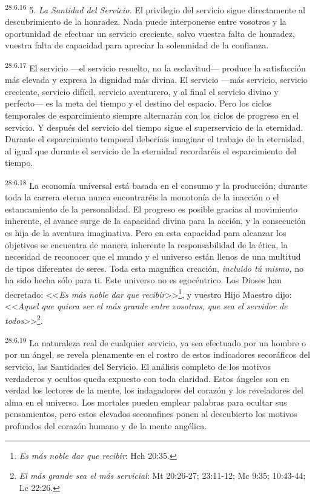 \par
\textsuperscript{28:6.16} 5. \textit{La Santidad del Servicio.} El privilegio del servicio sigue directamente al descubrimiento de la honradez. Nada puede interponerse entre vosotros y la oportunidad de efectuar un servicio creciente, salvo vuestra falta de honradez, vuestra falta de capacidad para apreciar la solemnidad de la confianza.

\par
\textsuperscript{28:6.17} El servicio ---el servicio resuelto, no la esclavitud--- produce la satisfacción más elevada y expresa la dignidad más divina. El servicio ---más servicio, servicio creciente, servicio difícil, servicio aventurero, y al final el servicio divino y perfecto--- es la meta del tiempo y el destino del espacio. Pero los ciclos temporales de esparcimiento siempre alternarán con los ciclos de progreso en el servicio. Y después del servicio del tiempo sigue el superservicio de la eternidad. Durante el esparcimiento temporal deberíais imaginar el trabajo de la eternidad, al igual que durante el servicio de la eternidad recordaréis el esparcimiento del tiempo.

\par
\textsuperscript{28:6.18} La economía universal está basada en el consumo y la producción; durante toda la carrera eterna nunca encontraréis la monotonía de la inacción o el estancamiento de la personalidad. El progreso es posible gracias al movimiento inherente, el avance surge de la capacidad divina para la acción, y la consecución es hija de la aventura imaginativa. Pero en esta capacidad para alcanzar los objetivos se encuentra de manera inherente la responsabilidad de la ética, la necesidad de reconocer que el mundo y el universo están llenos de una multitud de tipos diferentes de seres. Toda esta magnífica creación, \textit{incluido tú mismo,} no ha sido hecha sólo para ti. Este universo no es egocéntrico. Los Dioses han decretado: <<\textit{Es más noble dar que recibir}>>\footnote{\textit{Es más noble dar que recibir}: Hch 20:35.}, y vuestro Hijo Maestro dijo: <<\textit{Aquel que quiera ser el más grande entre vosotros, que sea el servidor de todos}>>\footnote{\textit{El más grande sea el más servicial}: Mt 20:26-27; 23:11-12; Mc 9:35; 10:43-44; Lc 22:26.}.

\par
\textsuperscript{28:6.19} La naturaleza real de cualquier servicio, ya sea efectuado por un hombre o por un ángel, se revela plenamente en el rostro de estos indicadores secoráficos del servicio, las Santidades del Servicio. El análisis completo de los motivos verdaderos y ocultos queda expuesto con toda claridad. Estos ángeles son en verdad los lectores de la mente, los indagadores del corazón y los reveladores del alma en el universo. Los mortales pueden emplear palabras para ocultar sus pensamientos, pero estos elevados seconafines ponen al descubierto los motivos profundos del corazón humano y de la mente angélica.


